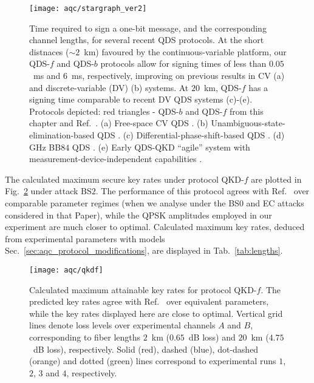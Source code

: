 \begin{figure}[htp]
\captionsetup{width=0.8\linewidth}
\centering
\texttt{[image: aqc/stargraph\_ver2]}
\caption{\label{fig:aqc_star} Time required to sign a one-bit message, and the corresponding channel lengths, for several recent QDS protocols. At the short distnaces ($\sim 2$~km) favoured by the continuous-variable platform, our QDS-$f$ and QDS-$b$ protocols allow for signing times of less than $0.05$~ms and $6$~ms, respectively, improving on previous results in CV (a) and discrete-variable (DV) (b) systems. At $20$~km, QDS-$f$ has a signing time comparable to recent DV QDS systems (c)-(e). Protocols depicted: red triangles - QDS-$b$ and QDS-$f$ from this chapter and Ref.~\cite{Richter2020}. (a) Free-space CV QDS \cite{Croal2016}. (b) Unambiguous-state-elimination-based QDS \cite{Donaldson2016}. (c) Differential-phase-shift-based QDS \cite{Collins2016}. (d) GHz BB$84$ QDS \cite{An2019}. (e) Early QDS-QKD ``agile'' system with measurement-device-independent capabilities \cite{Roberts2017}.}
\end{figure}


The calculated maximum secure key rates under protocol QKD-$f$ are plotted in Fig.~\ref{fig:aqc_qkdf} under attack BS$2$. The performance of this protocol agrees with Ref.~\cite{Papanastasiou2018} over comparable parameter regimes (when we analyse under the BS$0$ and EC attacks considered in that Paper), while the QPSK amplitudes employed in our experiment are much closer to optimal. Calculated maximum key rates, deduced from experimental parameters with models Sec.~\ref{sec:aqc_protocol_modifications}, are displayed in Tab.~\ref{tab:lengths}.

\begin{figure}[htp]
\centering
\captionsetup{width=0.8\linewidth}
\texttt{[image: aqc/qkdf]}
\caption{\label{fig:aqc_qkdf} Calculated maximum attainable key rates for protocol QKD-$f$. The predicted key rates agree with Ref.~\cite{Papanastasiou2018} over equivalent parameters, while the key rates displayed here are close to optimal. Vertical grid lines denote loss levels over experimental channels $A$ and $B$, corresponding to fiber lengths $2$~km ($0.65$~dB loss) and $20$~km ($4.75$~dB loss), respectively. Solid (red), dashed (blue), dot-dashed (orange) and dotted (green) lines correspond to experimental runs $1$, $2$, $3$ and $4$, respectively.}
\end{figure}



